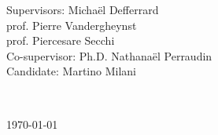 \begin{titlepage}
\begin{minipage}{1\textwidth}
	\begin{flushleft} \large
		Supervisors: \hspace{0.3cm} Micha\"el Defferrard\\
		\hspace{3.2cm} prof. Pierre Vandergheynst\\
		\hspace{3.2cm} prof. Piercesare Secchi\\
		Co-supervisor:  Ph.D. Nathana\"el Perraudin\\
		\vspace{0.5cm}
		Candidate: \hspace{0.55cm} Martino Milani
		\end{flushleft}
	\vspace{2cm}
\end{minipage}
~

{\large \today } %
\vspace{0cm}
\end{titlepage}